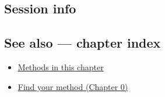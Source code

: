 \documentclass[
]{article}
\newenvironment{Shaded}{\begin{snugshade}}{\end{snugshade}}
\providecommand{\tightlist}{%
  \setlength{\itemsep}{0pt}\setlength{\parskip}{0pt}}
\begin{document}
\subsection{Session info}\label{session-info}

\begin{Shaded}
\begin{Highlighting}[]

\end{Highlighting}
\end{Shaded}

\subsection{See also --- chapter index}\label{see-also-chapter-index}

\begin{itemize}
\tightlist
\item
  \href{../index.Rmd}{Methods in this chapter}
\item
  \href{../../../ch00-find-your-method.Rmd}{Find your method (Chapter
  0)}
\end{itemize}
\end{document}
